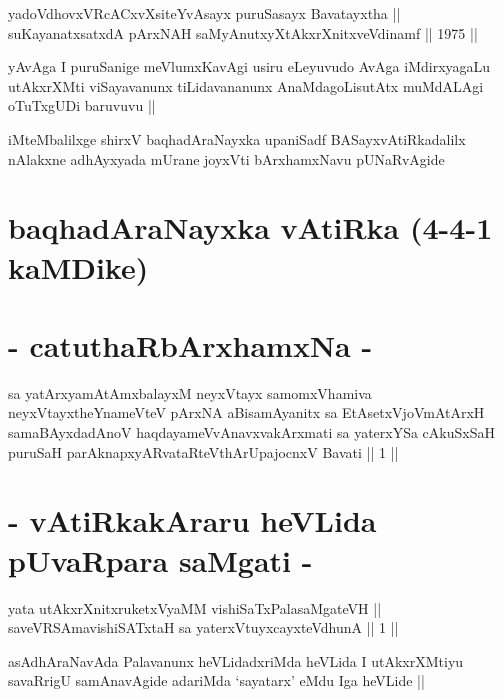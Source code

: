 \begin{shl}
yadoVdhovxVRcACxvXsiteYvAsayx puruSasayx Bavatayxtha || \\
suKayanatxsatxdA pArxNAH saMyAnutxyXtAkxrXnitxveVdinamf ||  1975 ||  
\end{shl}

\begin{artha}
yAvAga I puruSanige meVlumxKavAgi usiru eLeyuvudo AvAga iMdirxyagaLu
utAkxrXMti viSayavanunx tiLidavananunx AnaMdagoLisutAtx muMdALAgi
oTuTxgUDi baruvuvu ||
\end{artha}

\begin{center}
iMteMbalilxge shirxV baqhadAraNayxka upaniSadf BASayxvAtiRkadalilx
nAlakxne adhAyxyada mUrane joyxVti bArxhamxNavu  pUNaRvAgide 
\end{center}

\section*{baqhadAraNayxka vAtiRka (4-4-1 kaMDike)}

\section*{- catuthaRbArxhamxNa -}

\begin{shl}
sa yatArxyamAtAmxbalayxM neyxVtayx samomxVhamiva neyxVtayxtheYnameVteV pArxNA aBisamAyanitx sa EtAsetxVjoVmAtArxH samaBAyxdadAnoV haqdayameVvAnavxvakArxmati sa yaterxYSa cAkuSxSaH puruSaH parAknapxyARvataRteV\s thArUpajocnxV Bavati || 1 ||
\end{shl}

\section*{- vAtiRkakAraru heVLida pUvaRpara saMgati -}


\begin{shl}
yata utAkxrXnitxruketxVyaMM vishiSaTxPalasaMgateVH || \\
saveVRSAmavishiSATx\s taH sa yaterxVtuyxcayxteV\s dhunA ||  1 ||  
\end{shl}

\begin{artha}
asAdhAraNavAda Palavanunx heVLidadxriMda heVLida I utAkxrXMtiyu
savaRrigU samAnavAgide adariMda `sayatarx' eMdu Iga heVLide ||
\end{artha}


